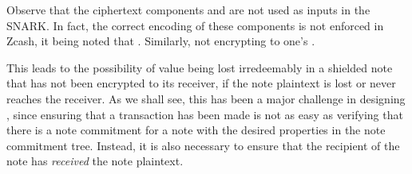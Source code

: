 Observe that the ciphertext components \cenc and \cout are not used as inputs in the SNARK.
In fact, the correct encoding of these components is not enforced in Zcash, it being noted that .
Similarly, not encrypting \cout to one's \ovk {}.

This leads to the possibility of value being lost irredeemably in a shielded note that has not been encrypted to its receiver, if the note plaintext is lost or never reaches the receiver.
As we shall see, this has been a major challenge in designing \zclaim, since ensuring that a transaction has been made is not as easy as verifying that there is a note commitment for a note with the desired properties in the note commitment tree.
Instead, it is also necessary to ensure that the recipient of the note has \emph{received} the note plaintext.